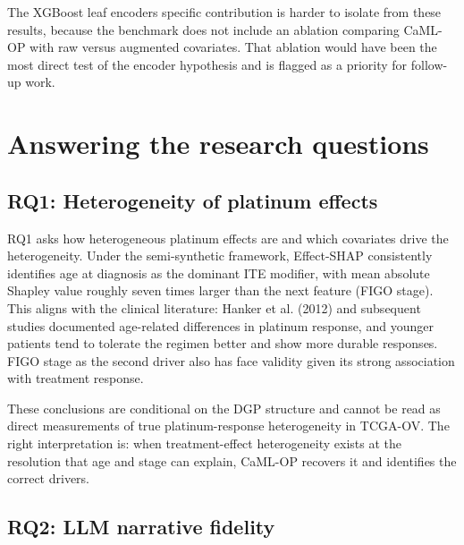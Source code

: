 The XGBoost leaf encoder\textquotesingle s specific contribution is harder to isolate from these results, because the benchmark does not include an ablation comparing CaML-OP with raw versus augmented covariates. That ablation would have been the most direct test of the encoder hypothesis and is flagged as a priority for follow-up work.

\section{Answering the research questions}\label{answering-the-research-questions}

\subsection{RQ1: Heterogeneity of platinum effects}\label{rq1, heterogeneity-of-platinum-effects}

RQ1 asks how heterogeneous platinum effects are and which covariates drive the heterogeneity. Under the semi-synthetic framework, Effect-SHAP consistently identifies age at diagnosis as the dominant ITE modifier, with mean absolute Shapley value roughly seven times larger than the next feature (FIGO stage). This aligns with the clinical literature: Hanker et al. (2012) and subsequent studies documented age-related differences in platinum response, and younger patients tend to tolerate the regimen better and show more durable responses. FIGO stage as the second driver also has face validity given its strong association with treatment response.

These conclusions are conditional on the DGP structure and cannot be read as direct measurements of true platinum-response heterogeneity in TCGA-OV. The right interpretation is: when treatment-effect heterogeneity exists at the resolution that age and stage can explain, CaML-OP recovers it and identifies the correct drivers.

\subsection{RQ2: LLM narrative fidelity}\label{rq2, llm-narrative-fidelity}

